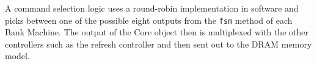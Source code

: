 A command selection logic uses a round-robin implementation in software and picks between one of the possible eight outputs from the \verb|fsm| method of each Bank Machine. The output of the Core object then is multiplexed with the other controllers such as the refresh controller and then sent out to the DRAM memory model.
